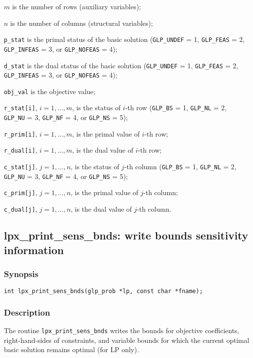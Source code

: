 \noindent
$m$ is the number of rows (auxiliary variables);

\noindent
$n$ is the number of columns (structural variables);

\noindent
\verb|p_stat| is the primal status of the basic solution
(\verb|GLP_UNDEF| = 1, \verb|GLP_FEAS| = 2, \verb|GLP_INFEAS| = 3, or
\verb|GLP_NOFEAS| = 4);

\noindent
\verb|d_stat| is the dual status of the basic solution
(\verb|GLP_UNDEF| = 1, \verb|GLP_FEAS| = 2, \verb|GLP_INFEAS| = 3, or
\verb|GLP_NOFEAS| = 4);

\noindent
\verb|obj_val| is the objective value;

\noindent
\verb|r_stat[i]|, $i=1,\dots,m$, is the status of $i$-th row
(\verb|GLP_BS| = 1, \verb|GLP_NL| = 2, \verb|GLP_NU| = 3,
\verb|GLP_NF| = 4, or \verb|GLP_NS| = 5);

\noindent
\verb|r_prim[i]|, $i=1,\dots,m$, is the primal value of $i$-th row;

\noindent
\verb|r_dual[i]|, $i=1,\dots,m$, is the dual value of $i$-th row;

\noindent
\verb|c_stat[j]|, $j=1,\dots,n$, is the status of $j$-th column
(\verb|GLP_BS| = 1, \verb|GLP_NL| = 2, \verb|GLP_NU| = 3,
\verb|GLP_NF| = 4, or \verb|GLP_NS| = 5);

\noindent
\verb|c_prim[j]|, $j=1,\dots,n$, is the primal value of $j$-th column;

\noindent
\verb|c_dual[j]|, $j=1,\dots,n$, is the dual value of $j$-th column.

\subsection{lpx\_print\_sens\_bnds: write bounds sensitivity
information}

\subsubsection*{Synopsis}

\begin{verbatim}
int lpx_print_sens_bnds(glp_prob *lp, const char *fname);
\end{verbatim}

\subsubsection*{Description}

The routine \verb|lpx_print_sens_bnds| writes the bounds for objective
coefficients, right-hand-sides of constraints, and variable bounds
for which the current optimal basic solution remains optimal (for LP
only).

